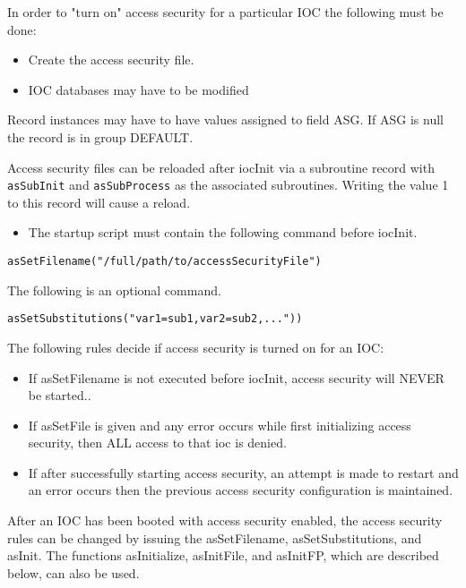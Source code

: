 In order to "turn on" access security for a particular IOC the following must be done:

\begin{itemize}\item Create the access security file.

\item IOC databases may have to be modified

\end{itemize}Record instances may have to have values assigned to field ASG. If ASG is null the record is in group 
DEFAULT. 

Access security files can be reloaded after iocInit via a subroutine record with \verb|asSubInit| and 
\verb|asSubProcess| as the associated subroutines. Writing the value 1 to this record will cause a reload.

\begin{itemize}\item The startup script must contain the following command before iocInit.

\end{itemize}\begin{verbatim}asSetFilename("/full/path/to/accessSecurityFile")
\end{verbatim}\begin{description}\item The following is an optional command.

\end{description}\begin{verbatim}asSetSubstitutions("var1=sub1,var2=sub2,..."))
\end{verbatim}The following rules decide if access security is turned on for an IOC:

\begin{itemize}\item If asSetFilename is not executed before iocInit, access security will NEVER be started..

\item If asSetFile is given and any error occurs while first initializing access security, then ALL access to that ioc is 
denied.

\item If after successfully starting access security, an attempt is made to restart and an error occurs then the previous 
access security configuration is maintained.

\end{itemize}After an IOC has been booted with access security enabled, the access security rules can be changed by issuing the 
asSetFilename, asSetSubstitutions, and asInit. The functions asInitialize, asInitFile, and asInitFP, which are described 
below, can also be used.

